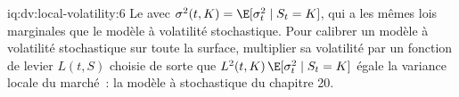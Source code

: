 \begin{solution}{iq:dv:local-volatility:6}
Le  avec $\sigma^2(t,K)=\E[\sigma_t^2\mid S_t=K]$, qui a les mêmes lois marginales que le
modèle à volatilité stochastique. Pour calibrer un modèle à volatilité stochastique sur toute la surface, multiplier sa volatilité par un
fonction de levier $L(t,S)$ choisie de sorte que $L^2(t,K)\,\E[\sigma_t^2\mid S_t=K]$ égale la variance locale du marché~: la
modèle à  stochastique du chapitre 20.
\end{solution}
